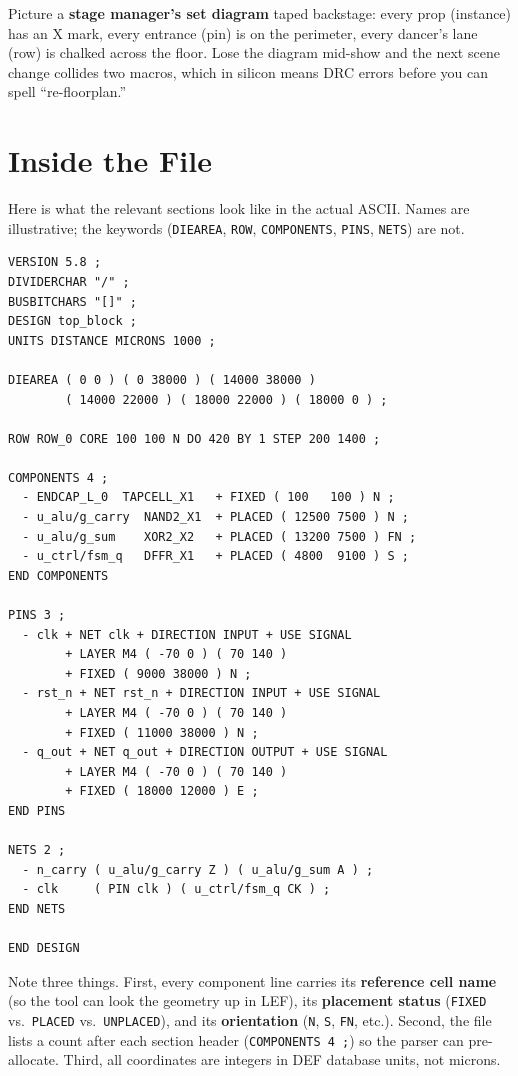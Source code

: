 \begin{hook}
Picture a \textbf{stage manager's set diagram} taped backstage: every prop (instance) has an X mark, every entrance (pin) is on the perimeter, every dancer's lane (row) is chalked across the floor. Lose the diagram mid-show and the next scene change collides two macros, which in silicon means DRC errors before you can spell ``re-floorplan.''
\end{hook}

\section{Inside the File}

Here is what the relevant sections look like in the actual ASCII. Names are illustrative; the keywords (\texttt{DIEAREA}, \texttt{ROW}, \texttt{COMPONENTS}, \texttt{PINS}, \texttt{NETS}) are not.

\begin{lstlisting}[style=eda,caption={Skeleton of a DEF file. Each major section ends with an explicit \texttt{END} keyword.},label={lst:def-skeleton}]
VERSION 5.8 ;
DIVIDERCHAR "/" ;
BUSBITCHARS "[]" ;
DESIGN top_block ;
UNITS DISTANCE MICRONS 1000 ;

DIEAREA ( 0 0 ) ( 0 38000 ) ( 14000 38000 )
        ( 14000 22000 ) ( 18000 22000 ) ( 18000 0 ) ;

ROW ROW_0 CORE 100 100 N DO 420 BY 1 STEP 200 1400 ;

COMPONENTS 4 ;
  - ENDCAP_L_0  TAPCELL_X1   + FIXED ( 100   100 ) N ;
  - u_alu/g_carry  NAND2_X1  + PLACED ( 12500 7500 ) N ;
  - u_alu/g_sum    XOR2_X2   + PLACED ( 13200 7500 ) FN ;
  - u_ctrl/fsm_q   DFFR_X1   + PLACED ( 4800  9100 ) S ;
END COMPONENTS

PINS 3 ;
  - clk + NET clk + DIRECTION INPUT + USE SIGNAL
        + LAYER M4 ( -70 0 ) ( 70 140 )
        + FIXED ( 9000 38000 ) N ;
  - rst_n + NET rst_n + DIRECTION INPUT + USE SIGNAL
        + LAYER M4 ( -70 0 ) ( 70 140 )
        + FIXED ( 11000 38000 ) N ;
  - q_out + NET q_out + DIRECTION OUTPUT + USE SIGNAL
        + LAYER M4 ( -70 0 ) ( 70 140 )
        + FIXED ( 18000 12000 ) E ;
END PINS

NETS 2 ;
  - n_carry ( u_alu/g_carry Z ) ( u_alu/g_sum A ) ;
  - clk     ( PIN clk ) ( u_ctrl/fsm_q CK ) ;
END NETS

END DESIGN
\end{lstlisting}

Note three things. First, every component line carries its \textbf{reference cell name} (so the tool can look the geometry up in LEF), its \textbf{placement status} (\texttt{FIXED} vs.\ \texttt{PLACED} vs.\ \texttt{UNPLACED}), and its \textbf{orientation} (\texttt{N}, \texttt{S}, \texttt{FN}, etc.). Second, the file lists a count after each section header (\texttt{COMPONENTS 4 ;}) so the parser can pre-allocate. Third, all coordinates are integers in DEF database units, not microns.

